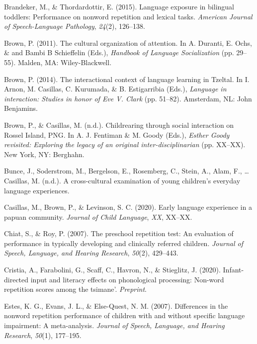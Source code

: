 \documentclass[english,,man,floatsintext]{apa6}
\begin{document}
\leavevmode\hypertarget{ref-brandeker2015language}{}%
Brandeker, M., \& Thordardottir, E. (2015). Language exposure in bilingual toddlers: Performance on nonword repetition and lexical tasks. \emph{American Journal of Speech-Language Pathology}, \emph{24}(2), 126--138.

\leavevmode\hypertarget{ref-brown2011cultural}{}%
Brown, P. (2011). The cultural organization of attention. In A. Duranti, E. Ochs, \& and Bambi B Schieffelin (Eds.), \emph{Handbook of Language Socialization} (pp. 29--55). Malden, MA: Wiley-Blackwell.

\leavevmode\hypertarget{ref-brown2014interactional}{}%
Brown, P. (2014). The interactional context of language learning in Tzeltal. In I. Arnon, M. Casillas, C. Kurumada, \& B. Estigarribia (Eds.), \emph{Language in interaction: Studies in honor of Eve V. Clark} (pp. 51--82). Amsterdam, NL: John Benjamins.

\leavevmode\hypertarget{ref-brownIPchildrearing}{}%
Brown, P., \& Casillas, M. (n.d.). Childrearing through social interaction on Rossel Island, PNG. In A. J. Fentiman \& M. Goody (Eds.), \emph{Esther Goody revisited: Exploring the legacy of an original inter-disciplinarian} (pp. XX--XX). New York, NY: Berghahn.

\leavevmode\hypertarget{ref-bunceURcrosscultural}{}%
Bunce, J., Soderstrom, M., Bergelson, E., Rosemberg, C., Stein, A., Alam, F., \ldots{} Casillas, M. (n.d.). A cross-cultural examination of young children's everyday language experiences.

\leavevmode\hypertarget{ref-casillas2020early}{}%
Casillas, M., Brown, P., \& Levinson, S. C. (2020). Early language experience in a papuan community. \emph{Journal of Child Language}, \emph{XX}, XX--XX.

\leavevmode\hypertarget{ref-chiat2007preschool}{}%
Chiat, S., \& Roy, P. (2007). The preschool repetition test: An evaluation of performance in typically developing and clinically referred children. \emph{Journal of Speech, Language, and Hearing Research}, \emph{50}(2), 429--443.

\leavevmode\hypertarget{ref-cristia2020infant}{}%
Cristia, A., Farabolini, G., Scaff, C., Havron, N., \& Stieglitz, J. (2020). Infant-directed input and literacy effects on phonological processing: Non-word repetition scores among the tsimane'. \emph{Preprint}.

\leavevmode\hypertarget{ref-estes2007differences}{}%
Estes, K. G., Evans, J. L., \& Else-Quest, N. M. (2007). Differences in the nonword repetition performance of children with and without specific language impairment: A meta-analysis. \emph{Journal of Speech, Language, and Hearing Research}, \emph{50}(1), 177--195.
\end{document}
